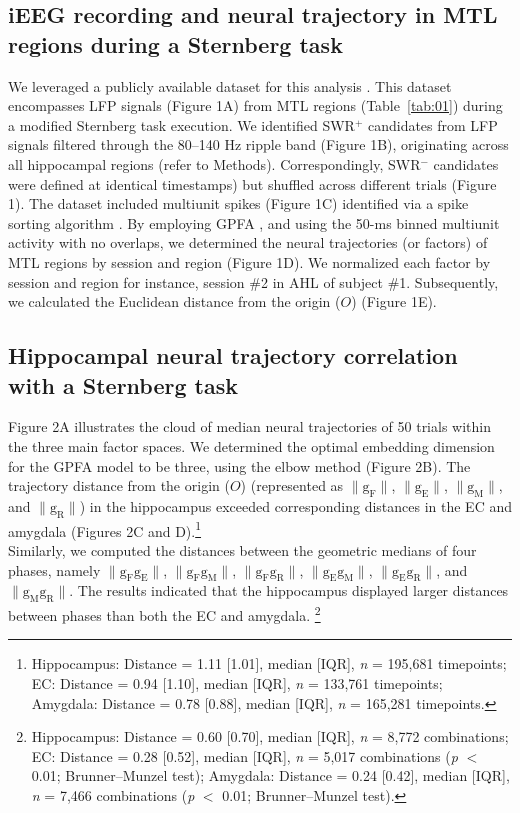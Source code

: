 \documentclass[final,3p,times,twocolumn]{elsarticle}
\begin{document}
\subsection{iEEG recording and neural trajectory in MTL regions during a Sternberg task}
We leveraged a publicly available dataset for this analysis \cite{boran_dataset_2020}. This dataset encompasses LFP signals (Figure 1A) from MTL regions (Table~\ref{tab:01}) during a modified Sternberg task execution. We identified SWR$^+$ candidates from LFP signals filtered through the 80--140 Hz ripple band (Figure 1B), originating across all hippocampal regions (refer to Methods). Correspondingly, SWR$^-$ candidates were defined at identical timestamps) but shuffled across different trials (Figure 1). The dataset included multiunit spikes (Figure 1C) identified via a spike sorting algorithm \cite{niediek_reliable_2016}. By employing GPFA \cite{yu_gaussian-process_2009}, and using the 50-ms binned multiunit activity with no overlaps, we determined the neural trajectories (or factors) of MTL regions by session and region (Figure 1D). We normalized each factor by session and region for instance, session \#2 in AHL of subject \#1. Subsequently, we calculated the Euclidean distance from the origin ($O$) (Figure 1E).

\subsection{Hippocampal neural trajectory correlation with a Sternberg task}
Figure 2A illustrates the cloud of median neural trajectories of 50 trials within the three main factor spaces. We determined the optimal embedding dimension for the GPFA model to be three, using the elbow method (Figure 2B). The trajectory distance from the origin ($O$) (represented as $\mathrm{\lVert g_{F} \rVert}$, $\mathrm{\lVert g_{E} \rVert}$, $\mathrm{\lVert g_{M} \rVert}$, and $\mathrm{\lVert g_{R} \rVert}$) in the hippocampus exceeded corresponding distances in the EC and amygdala (Figures 2C and D).\footnote{Hippocampus: Distance = 1.11 [1.01], median [IQR], \textit{n} = 195,681 timepoints; EC: Distance = 0.94 [1.10], median [IQR], \textit{n} = 133,761 timepoints; Amygdala: Distance = 0.78 [0.88], median [IQR], \textit{n} = 165,281 timepoints.}
\\
\indent
Similarly, we computed the distances between the geometric medians of four phases, namely $\mathrm{\lVert g_{F}g_{E} \rVert}$, $\mathrm{\lVert g_{F}g_{M} \rVert}$, $\mathrm{\lVert g_{F}g_{R} \rVert}$, $\mathrm{\lVert g_{E}g_{M} \rVert}$, $\mathrm{\lVert g_{E}g_{R} \rVert}$, and $\mathrm{\lVert g_{M}g_{R} \rVert}$. The results indicated that the hippocampus displayed larger distances between phases than both the EC and amygdala. \footnote{Hippocampus: Distance = 0.60 [0.70], median [IQR], \textit{n} = 8,772 combinations; EC: Distance = 0.28 [0.52], median [IQR], \textit{n} = 5,017 combinations (\textit{p} $<$ 0.01; Brunner--Munzel test); Amygdala: Distance = 0.24 [0.42], median [IQR], \textit{n} = 7,466 combinations (\textit{p} $<$ 0.01; Brunner--Munzel test).}
\end{document}
